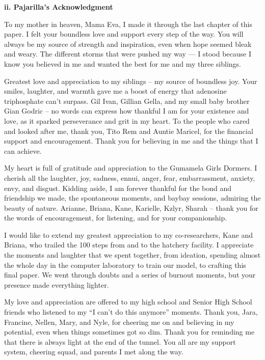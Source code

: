 \vspace{0.5cm}
\noindent\textbf{ii. Pajarilla's Acknowledgment} \\
\vspace{-0.5cm}

To my mother in heaven, Mama Eva, I made it through the last chapter of this paper. I felt your boundless love and support every step of the way. You will always be my source of strength and inspiration, even when hope seemed bleak and weary. The different storms that were pushed my way — I stood because I know you believed in me and wanted the best for me and my three siblings.

Greatest love and appreciation to my siblings – my source of boundless joy. Your smiles, laughter, and warmth gave me a boost of energy that adenosine triphosphate can’t surpass. Gil Ivan, Gillian Gella, and my small baby brother Gian Godric – no words can express how thankful I am for your existence and love, as it sparked perseverance and grit in my heart.
To the people who cared and looked after me, thank you, Tito Rem and Auntie Maricel, for the financial support and encouragement. Thank you for believing in me and the things that I can achieve.

My heart is full of gratitude and appreciation to the Gumamela Girls Dormers. I cherish all the laughter, joy, sadness, ennui, anger, fear, embarrassment, anxiety, envy, and disgust. Kidding aside, I am forever thankful for the bond and friendship we made, the spontaneous moments, and baybay sessions, admiring the beauty of nature. Arianne, Briana, Kane, Karielle, Kzlyr, Sharah – thank you for the words of encouragement, for listening, and for your companionship.

I would like to extend my greatest appreciation to my co-researchers, Kane and Briana, who trailed the 100 steps from and to the hatchery facility. I appreciate the moments and laughter that we spent together, from ideation, spending almost the whole day in the computer laboratory to train our model, to crafting this final paper. We went through doubts and a series of burnout moments, but your presence made everything lighter.

My love and appreciation are offered to my high school and Senior High School friends who listened to my “I can’t do this anymore” moments. Thank you, Jara, Francine, Nellen, Mary, and Nyle, for cheering me on and believing in my potential, even when things sometimes got so dim. Thank you for reminding me that there is always light at the end of the tunnel. You all are my support system, cheering squad, and parents I met along the way.

